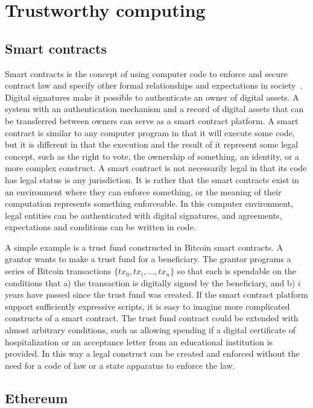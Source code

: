 \section{Trustworthy computing}
\label{sec:trustworthy}

\subsection{Smart contracts}

Smart contracts is the concept of using computer code to enforce and secure contract law and specify other formal relationships and expectations in  society~\cite{szabo_formalizing_1997}. Digital signatures make it possible to authenticate an owner of digital assets. A system with an authentication mechanism and a record of digital assets that can be transferred between owners can serve as a smart contract platform. A smart contract is similar to any computer program in that it will execute some code, but it is different in that the execution and the result of it represent some legal concept, such as the right to vote, the ownership of something, an identity, or a more complex construct. A smart contract is not necessarily legal in that its code has legal status is any jurisdiction. It is rather that the smart contracts exist in an environment where they can enforce something, or the meaning of their computation represents something enforceable. In this computer environment, legal entities can be authenticated with digital signatures, and agreements, expectations and conditions can be written in code.

A simple example is a trust fund constructed in Bitcoin smart contracts. A grantor wants to make a trust fund for a beneficiary. The grantor programs a series of Bitcoin transactions $\{tx_0, tx_i, ..., tx_n\}$ so that each is spendable on the conditions that a) the transaction is digitally signed by the beneficiary, and b) $i$ years have passed since the trust fund was created. If the smart contract platform support sufficiently expressive scripts, it is easy to imagine more complicated constructs of a smart contract. The trust fund contract could be extended with almost arbitrary conditions, such as allowing spending if a digital certificate of hospitalization or an acceptance letter from an educational institution is provided. In this way a legal construct can be created and enforced without the need for a code of law or a state apparatus to enforce the law.

\subsection{Ethereum}

